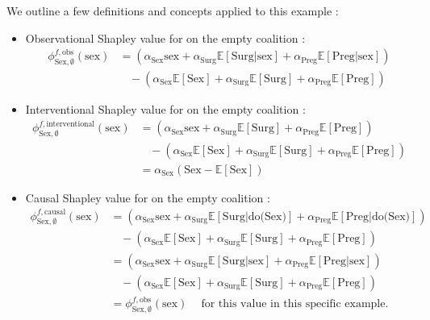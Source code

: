We outline a few definitions and concepts applied to this example :
\begin{itemize}
    \item Observational Shapley value for  on the empty coalition :
    \begin{align*}
        \phi^{f,\text{obs}}_{\text{Sex},\emptyset}(\text{sex}) &= (\alpha_\text{Sex} \text{sex} + \alpha_\text{Surg} \mathbb{E}[\text{Surg}|\text{sex}] + \alpha_\text{Preg} \mathbb{E}[\text{Preg}|\text{sex}])\\
        & \ \ \ \ - (\alpha_\text{Sex} \mathbb{E}[\text{Sex}] + \alpha_\text{Surg} \mathbb{E}[\text{Surg}] + \alpha_\text{Preg} \mathbb{E}[\text{Preg}]) 
    \end{align*}
    \item Interventional Shapley value for  on the empty coalition :
    \begin{align*}
        \phi^{f,\text{interventional}}_{\text{Sex},\emptyset}(\text{sex}) &= (\alpha_\text{Sex} \text{sex} + \alpha_\text{Surg} \mathbb{E}[\text{Surg}] + \alpha_\text{Preg} \mathbb{E}[\text{Preg}])\\
        & \ \ \ \ - (\alpha_\text{Sex} \mathbb{E}[\text{Sex}] + \alpha_\text{Surg} \mathbb{E}[\text{Surg}] + \alpha_\text{Preg} \mathbb{E}[\text{Preg}]) \\
        &= \alpha_\text{Sex} (\text{Sex} - \mathbb{E}[\text{Sex}])
    \end{align*}
    \item Causal Shapley value for  on the empty coalition :
    \begin{align*}
        \phi^{f,\text{causal}}_{\text{Sex},\emptyset}(\text{sex})
        &= (\alpha_\text{Sex} \text{sex} + \alpha_\text{Surg} \mathbb{E}[\text{Surg}|\text{do(Sex)}] + \alpha_\text{Preg} \mathbb{E}[\text{Preg}|\text{do(Sex)}])\\
        & \ \ \ \ - (\alpha_\text{Sex} \mathbb{E}[\text{Sex}] + \alpha_\text{Surg} \mathbb{E}[\text{Surg}] + \alpha_\text{Preg} \mathbb{E}[\text{Preg}]) \\
        &= (\alpha_\text{Sex} \text{sex} + \alpha_\text{Surg} \mathbb{E}[\text{Surg}|\text{sex}] + \alpha_\text{Preg} \mathbb{E}[\text{Preg}|\text{sex}])\\
        & \ \ \ \ - (\alpha_\text{Sex} \mathbb{E}[\text{Sex}] + \alpha_\text{Surg} \mathbb{E}[\text{Surg}] + \alpha_\text{Preg} \mathbb{E}[\text{Preg}]) \\
        &= \phi^{f,\text{obs}}_{\text{Sex},\emptyset}(\text{sex}) \ \ \ \ \text{ for this value in this specific example}.

\end{align*}
\end{itemize}
